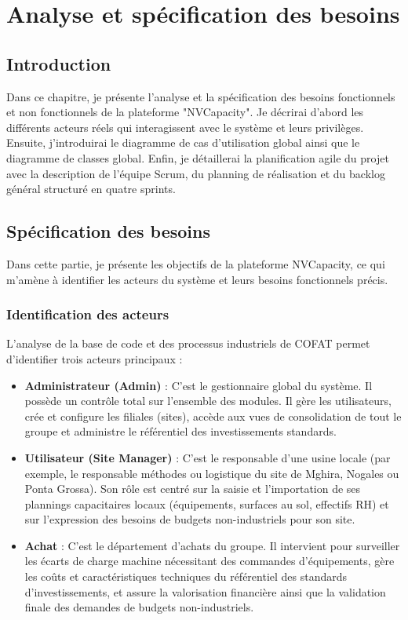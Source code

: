 \chapter{Analyse et spécification des besoins}

\section*{Introduction}

Dans ce chapitre, je présente l'analyse et la spécification des besoins fonctionnels et non fonctionnels de la plateforme "NVCapacity". Je décrirai d'abord les différents acteurs réels qui interagissent avec le système et leurs privilèges. Ensuite, j'introduirai le diagramme de cas d'utilisation global ainsi que le diagramme de classes global. Enfin, je détaillerai la planification agile du projet avec la description de l'équipe Scrum, du planning de réalisation et du backlog général structuré en quatre sprints.

\section{Spécification des besoins} 

Dans cette partie, je présente les objectifs de la plateforme NVCapacity, ce qui m'amène à identifier les acteurs du système et leurs besoins fonctionnels précis.

\subsection{Identification des acteurs}

L'analyse de la base de code et des processus industriels de COFAT permet d'identifier trois acteurs principaux :

\begin{itemize}[label=\textbullet]
    \item \textbf{Administrateur (Admin)} : C'est le gestionnaire global du système. Il possède un contrôle total sur l'ensemble des modules. Il gère les utilisateurs, crée et configure les filiales (sites), accède aux vues de consolidation de tout le groupe et administre le référentiel des investissements standards.
    \item \textbf{Utilisateur (Site Manager)} : C'est le responsable d'une usine locale (par exemple, le responsable méthodes ou logistique du site de Mghira, Nogales ou Ponta Grossa). Son rôle est centré sur la saisie et l'importation de ses plannings capacitaires locaux (équipements, surfaces au sol, effectifs RH) et sur l'expression des besoins de budgets non-industriels pour son site.
    \item \textbf{Achat} : C'est le département d'achats du groupe. Il intervient pour surveiller les écarts de charge machine nécessitant des commandes d'équipements, gère les coûts et caractéristiques techniques du référentiel des standards d'investissements, et assure la valorisation financière ainsi que la validation finale des demandes de budgets non-industriels.
\end{itemize}

